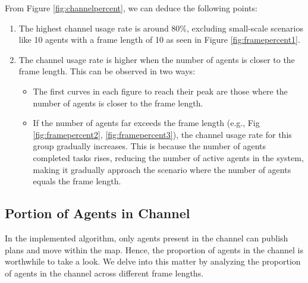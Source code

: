 From Figure \ref{fig:channelpercent}, we can deduce the following points:
\begin{enumerate}
    \item 
    The highest channel usage rate is around 80\%, excluding small-scale scenarios like 10 agents with a frame length of 10 as seen in Figure \ref{fig:framepercent1}.
    \item 
    The channel usage rate is higher when the number of agents is closer to the frame length. This can be observed in two ways:
    \begin{itemize}
        \item 
        The first curves in each figure to reach their peak are those where the number of agents is closer to the frame length.
        \item
        If the number of agents far exceeds the frame length (e.g., Fig \ref{fig:framepercent2}, \ref{fig:framepercent3}), the channel usage rate for this group gradually increases. This is because the number of agents completed tasks rises, reducing the number of active agents in the system, making it gradually approach the scenario where the number of agents equals the frame length.
    \end{itemize}
\end{enumerate}


\subsection{Portion of Agents in Channel}

In the implemented algorithm, only agents present in the channel can publish plans and move within the map. Hence, the proportion of agents in the channel is worthwhile to take a look.
We delve into this matter by analyzing the proportion of agents in the channel across different frame lengths.

